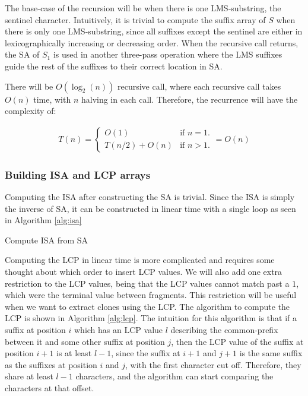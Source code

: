 The base-case of the recursion will be when there is one LMS-substring, the sentinel
character. Intuitively, it is trivial to compute the suffix array of $S$ when there is
only one LMS-substring, since all suffixes except the sentinel are either in
lexicographically increasing or decreasing order. When the recursive call returns, the SA
of $S_1$ is used in another three-pass operation where the LMS suffixes guide the rest of
the suffixes to their correct location in SA.

There will be $O(\log_2(n))$ recursive call, where each recursive call takes $O(n)$ time,
with $n$ halving in each call. Therefore, the recurrence will have the complexity of:

\begin{gather*}
    T(n) =
\begin{cases}
    O(1) & \text{if } n = 1. \\
    T(n / 2) + O(n) & \text{if } n > 1.
\end{cases}
= O(n)
\end{gather*}

\subsubsection{Building ISA and LCP arrays}

Computing the ISA after constructing the SA is trivial. Since the ISA is simply the inverse
of SA, it can be constructed in linear time with a single loop as seen in Algorithm
\ref{alg:isa}

\begin{algorithm}[htp]
  \SetAlgoLined\DontPrintSemicolon

  \vspace{0.5cm}
  \caption{Compute ISA from SA}
  \label{alg:isa}
\end{algorithm}


Computing the LCP in linear time is more complicated and requires some thought about which
order to insert LCP values. We will also add one extra restriction to the LCP values,
being that the LCP values cannot match past a $1$, which were the terminal value between
fragments. This restriction will be useful when we want to extract clones using the LCP.
The algorithm to compute the LCP is shown in Algorithm \ref{alg:lcp}. The intuition for
this algorithm is that if a suffix at position $i$ which has an LCP value $l$ describing
the common-prefix between it and some other suffix at position $j$, then the LCP value of
the suffix at position $i + 1$ is at least $l - 1$, since the suffix at $i + 1$ and $j +
1$ is the same suffix as the suffixes at position $i$ and $j$, with the first character
cut off. Therefore, they share at least $l - 1$ characters, and the algorithm can start
comparing the characters at that offset.

